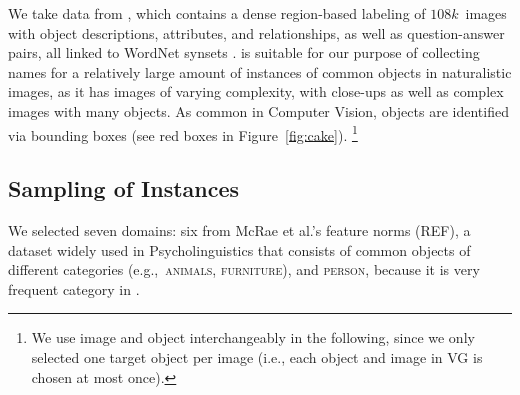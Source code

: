We take data from \vgenome \cite{krishna2016visualgenome}, which
contains a dense region-based labeling of $108k$~images with object descriptions, attributes, and relationships, as well as question-answer pairs, all linked to WordNet synsets \cite{fellbaum1998wordnet}.
\vgenome is suitable for our purpose of collecting names for a relatively large amount of instances of common objects in
naturalistic images, as it has images of varying complexity, with close-ups as well as complex images with many objects.
As common in Computer Vision, objects are identified via bounding boxes (see red boxes in Figure~\ref{fig:cake}).%
\footnote{We use image and object interchangeably in the following, since we only selected one target object per image (i.e., each object and image in VG is chosen at most once).}

\subsection{Sampling of Instances}

We selected seven domains: six from McRae et al.'s feature norms (REF), a dataset widely used in Psycholinguistics that consists of common objects of different categories (e.g.,~\textsc{animals}, \textsc{furniture}), and \textsc{person}, because it is very frequent category in \vgenome.

